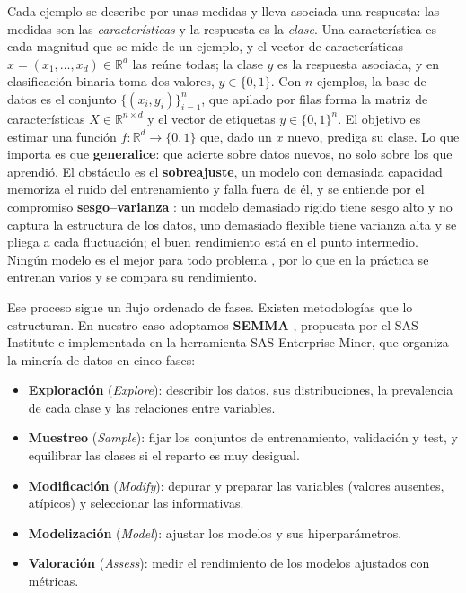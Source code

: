 \documentclass[12pt,a4paper]{report}
\theoremstyle{definition}
\begin{document}
Cada ejemplo se describe por unas medidas y lleva asociada una respuesta: las medidas son las
\emph{características} y la respuesta es la \emph{clase}. Una característica es cada magnitud que se mide
de un ejemplo, y el vector de características $x=(x_1,\dots,x_d)\in\mathbb{R}^d$ las reúne todas; la
clase $y$ es la respuesta asociada, y en clasificación binaria toma dos valores, $y\in\{0,1\}$. Con $n$
ejemplos, la base de datos es el conjunto $\{(x_i,y_i)\}_{i=1}^{n}$, que apilado por filas forma la
matriz de características $X\in\mathbb{R}^{n\times d}$ y el vector de etiquetas $y\in\{0,1\}^n$. El
objetivo es estimar una función $f\colon\mathbb{R}^d\to\{0,1\}$ que, dado un $x$ nuevo, prediga su
clase. Lo que importa es que \textbf{generalice}: que acierte sobre datos nuevos, no solo sobre los que
aprendió. El obstáculo es el \textbf{sobreajuste}, un modelo con demasiada capacidad memoriza el ruido
del entrenamiento y falla fuera de él, y se entiende por el compromiso \textbf{sesgo--varianza}
\cite{geman1992biasvariance}: un modelo demasiado rígido tiene sesgo alto y no captura la estructura de
los datos, uno demasiado flexible tiene varianza alta y se pliega a cada fluctuación; el buen
rendimiento está en el punto intermedio. Ningún modelo es el mejor para todo problema
\cite{wolpert1996nfl}, por lo que en la práctica se entrenan varios y se compara su rendimiento.

Ese proceso sigue un flujo ordenado de fases. Existen metodologías que lo estructuran. En nuestro caso adoptamos
\textbf{SEMMA} \cite{azevedo2008semma}, propuesta por el SAS Institute e implementada en la herramienta
SAS Enterprise Miner, que organiza la minería de datos en cinco fases:

\begin{itemize}
\item \textbf{Exploración} (\emph{Explore}): describir los datos, sus distribuciones, la prevalencia de
cada clase y las relaciones entre variables.
\item \textbf{Muestreo} (\emph{Sample}): fijar los conjuntos de entrenamiento, validación y test, y
equilibrar las clases si el reparto es muy desigual.
\item \textbf{Modificación} (\emph{Modify}): depurar y preparar las variables (valores ausentes,
atípicos) y seleccionar las informativas.
\item \textbf{Modelización} (\emph{Model}): ajustar los modelos y sus hiperparámetros.
\item \textbf{Valoración} (\emph{Assess}): medir el rendimiento de los modelos ajustados con métricas.
\end{itemize}
\end{document}
